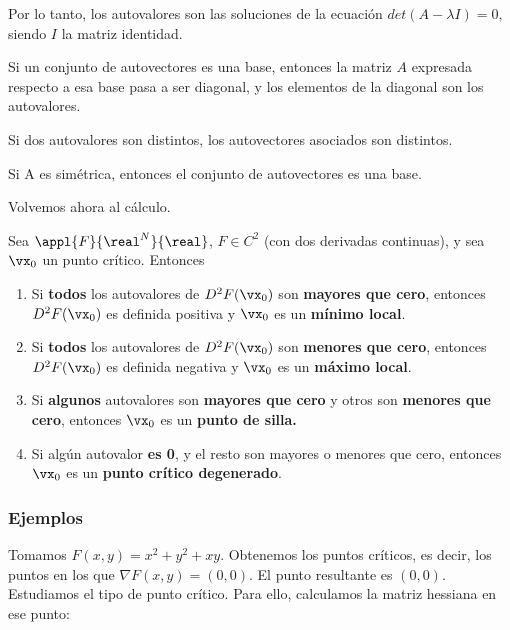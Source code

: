 \documentclass[nochap]{apuntes}
\begin{document}
Por lo tanto, los autovalores son las soluciones de la ecuación $det(A-\lambda I) = 0$, siendo $I$ la matriz identidad.

\begin{theorem}
Si un conjunto de autovectores es una base, entonces la matriz $A$ expresada respecto a esa base pasa a ser diagonal, y los elementos de la diagonal son los autovalores. 

Si dos autovalores son distintos, los autovectores asociados son distintos.

Si A es simétrica, entonces el conjunto de autovectores es una base.
\end{theorem}

Volvemos ahora al cálculo.

\begin{theorem}
Sea $\appl{F}{\real^N}{\real}$, $F\in C^2$ (con dos derivadas continuas), y sea $\vx_0$ un punto crítico. Entonces

\begin{enumerate}

\item Si \textbf{todos} los autovalores de $D^2F(\vx_0)$ son \textbf{mayores que cero}, entonces $D^2F(\vx_0)$ es definida positiva y $\vx_0$ es un \textbf{mínimo local}.
\item Si \textbf{todos} los autovalores de $D^2F(\vx_0)$ son \textbf{menores que cero}, entonces $D^2F(\vx_0)$ es definida negativa y $\vx_0$ es un \textbf{máximo local}.
\item Si \textbf{algunos} autovalores son \textbf{mayores que cero} y otros son \textbf{menores que cero}, entonces $\vx_0$ es un \textbf{punto de silla.}
\item Si algún autovalor \textbf{es 0}, y el resto son mayores o menores que cero, entonces $\vx_0$ es un \textbf{punto crítico degenerado}.
\end{enumerate}
\end{theorem}

\subsubsection{Ejemplos}

Tomamos $F(x,y) = x^2 + y^2 +xy$. Obtenemos los puntos críticos, es decir, los puntos en los que $\nabla F(x,y) = (0,0)$. El punto resultante es $(0,0)$. Estudiamos el tipo de punto crítico. Para ello, calculamos la matriz hessiana en ese punto:
\end{document}

